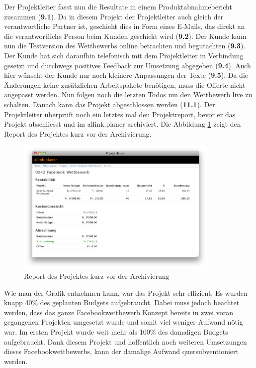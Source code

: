 Der Projektleiter fasst nun die Resultate in einem Produktabnahmebericht 
zusammen (\textbf{9.1}). Da in diesem Projekt der Projektleiter auch gleich der 
verantwortliche Partner ist, geschieht dies in Form eines E-Mails, das direkt an 
die verantwortliche Person beim Kunden geschickt wird (\textbf{9.2}). Der Kunde 
kann nun die Testversion des Wettbewerbs online betrachten und begutachten (\textbf{9.3}).
Der Kunde hat sich daraufhin telefonisch mit dem Projektleiter in Verbindung
gesetzt und durchwegs positives Feedback zur Umsetzung abgegeben (\textbf{9.4}).
Auch hier wünscht der Kunde nur noch kleinere Anpassungen der Texte (\textbf{9.5}).
Da die Änderungen keine zusätzlichen Arbeitspakete benötigen, muss die Offerte
nicht angepasst werden. Nun folgen noch die letzten Todos um den Wettbewerb live 
zu schalten. Danach kann das Projekt abgeschlossen werden (\textbf{11.1}).
Der Projektleiter überprüft noch ein letztes mal den Projektreport, bevor er
das Projekt abschliesst und im allink.planer archiviert. Die Abbildung \ref{pic:allink_planer_report_ende}
zeigt den Report des Projektes kurz vor der Archivierung.

\begin{figure}[htbp]
\begin{center}
\includegraphics[width=0.87\textwidth,angle=0]{./bilder/proof_of_concept/allink_planer_report_ende.png}
\caption[Report des Projektes kurz vor der Archivierung]{Report des Projektes 
    kurz vor der Archivierung\footnotemark}
\label{pic:allink_planer_report_ende}
\end{center}
\end{figure}

Wie man der Grafik entnehmen kann, war das Projekt sehr effizient. Es wurden knapp
40\% des geplanten Budgets aufgebraucht. Dabei muss jedoch beachtet werden,
dass das ganze Facebookwettbewerb Konzept bereits in zwei voran gegangenen Projekten
umgesetzt wurde und somit viel weniger Aufwand nötig war. Im ersten Projekt
wurde weit mehr als 100\% des damaligen Budgets aufgebraucht. Dank diesem
Projekt und hoffentlich noch weiteren Umsetzungen dieses Facebookwettbewerbs,
kann der damalige Aufwand quersubventioniert werden.

